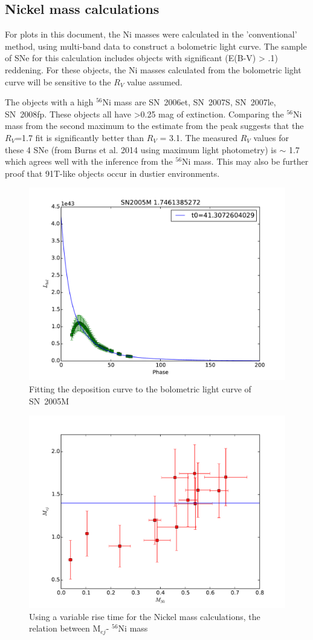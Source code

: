 \documentclass{article}
\newcommand{\Nif}{\rm $^{56}$Ni }
\begin{document}
\subsection*{Nickel mass calculations}
For plots in this document, the Ni masses were calculated in the 'conventional' method, using multi-band data to construct a bolometric light curve. The sample of SNe for this calculation includes objects with significant (E(B-V) > .1) reddening. For these objects, the Ni masses calculated from the bolometric light curve will be sensitive to the $R_V$ value assumed. 

The objects with a high \Nif mass are  SN~2006et, SN~2007S, SN~2007le, SN~2008fp. These objects all have \textgreater 0.25 mag of extinction. Comparing the \Nif mass from the second maximum to the estimate from the peak suggests that the $R_V$=1.7 fit is significantly better than $R_V$ = 3.1. The measured $R_V$ values for these 4 SNe (from Burns et al. 2014 using maximum light photometry) is $\sim$ 1.7 which agrees well with the inference from the \Nif mass. This may also be further proof that 91T-like objects occur in dustier environments.


 
\begin{figure}
\includegraphics[width=.5\textwidth, trim = 0 0 30 30]{SN2005M.pdf}
\caption{Fitting the deposition curve to the bolometric light curve of SN~2005M}
\label{fig:fit}
\end{figure}

\begin{figure}
\includegraphics[width=.5\textwidth, trim = 0 0 30 30]{mej_mni_risetime.pdf}
\caption{Using a variable rise time for the Nickel mass calculations, the relation between M$_{ej}$- \Nif mass}
\label{fig:mej-mni}
\end{figure}
\end{document}

